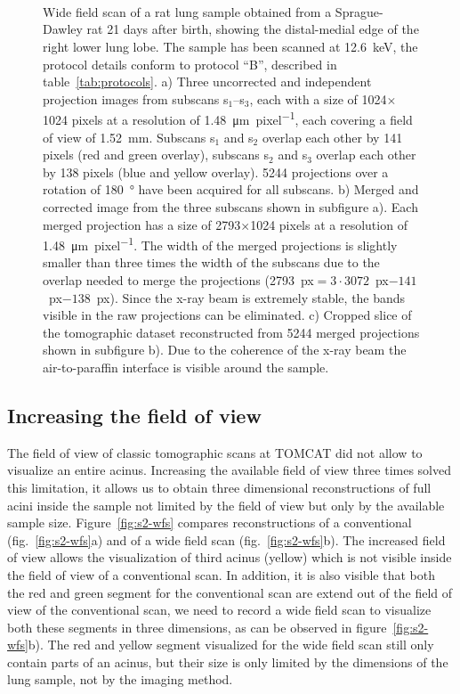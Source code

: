 	\begin{figure}[htp]
		\\%
		\\%
		\\%
			\caption{Wide field scan of a rat lung sample obtained from a Sprague-Dawley rat 21 days after birth, showing the distal-medial edge of the right lower lung lobe. The sample has been scanned at \SI{12.6}{\kilo\electronvolt}, the protocol details conform to protocol ``B'', described in table~\ref{tab:protocols}. %
		a) Three uncorrected and independent projection images from subscans s$_1$--s$_3$, each with a size of 1024\(\times\)1024 pixels at a resolution of \SI{1.48}{\micro\meter\per pixel}, each covering a field of view of \SI{1.52}{\milli\meter}. Subscans s$_1$ and s$_2$ overlap each other by 141 pixels (red and green overlay), subscans s$_2$ and s$_3$ overlap each other by 138 pixels (blue and yellow overlay). 5244 projections over a rotation of \SI{180}{\degree} have been acquired for all subscans. %
		b) Merged and corrected image from the three subscans shown in subfigure a). Each merged projection has a size of 2793\(\times\)1024 pixels at a resolution of \SI{1.48}{\micro\meter\per pixel}. The width of the merged projections is slightly smaller than three times the width of the subscans due to the overlap needed to merge the projections (2793~px$=3\cdot3072$~px$-141$~px$-138$~px). Since the x-ray beam is extremely stable, the bands visible in the raw projections can be eliminated. %
		c) Cropped slice of the tomographic dataset reconstructed from 5244 merged projections shown in subfigure b). Due to the coherence of the x-ray beam the air-to-paraffin interface is visible around the sample.%
		}%
		\label{fig:wide field scan results}%
	\end{figure}
\fi

\subsection{Increasing the field of view}
The field of view of classic tomographic scans at TOMCAT did not allow to visualize an entire acinus. Increasing the available field of view three times solved this limitation, it allows us to obtain three dimensional reconstructions of full acini inside the sample not limited by the field of view but only by the available sample size. Figure~\ref{fig:s2-wfs} compares reconstructions of a conventional (fig.~\ref{fig:s2-wfs}a) and of a wide field scan (fig.~\ref{fig:s2-wfs}b). The increased field of view allows the visualization of third acinus (yellow) which is not visible inside the field of view of a conventional scan. In addition, it is also visible that both the red and green segment for the conventional scan are extend out of the field of view of the conventional scan, we need to record a wide field scan to visualize both these segments in three dimensions, as can be observed in figure~\ref{fig:s2-wfs}b). The red and yellow segment visualized for the wide field scan still only contain parts of an acinus, but their size is only limited by the dimensions of the lung sample, not by the imaging method.

